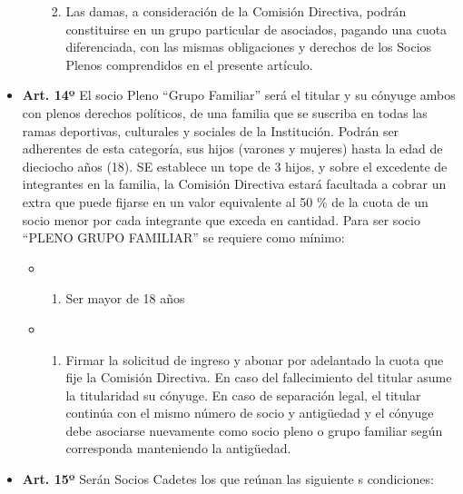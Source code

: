 \documentclass[]{book}
\providecommand{\tightlist}{%
  \setlength{\itemsep}{0pt}\setlength{\parskip}{0pt}}
\begin{document}
\begin{itemize}
\begin{itemize}
\begin{enumerate}
    \def\labelenumi{\alph{enumi})}
    \setcounter{enumi}{4}
    \tightlist
    \item
      Las damas, a consideración de la Comisión Directiva, podrán
      constituirse en un grupo particular de asociados, pagando una
      cuota diferenciada, con las mismas obligaciones y derechos de los
      Socios Plenos comprendidos en el presente artículo.
    \end{enumerate}
  \end{itemize}
\item
  \textbf{Art. 14º} El socio Pleno ``Grupo Familiar'' será el titular y
  su cónyuge ambos con plenos derechos políticos, de una familia que se
  suscriba en todas las ramas deportivas, culturales y sociales de la
  Institución. Podrán ser adherentes de esta categoría, sus hijos
  (varones y mujeres) hasta la edad de dieciocho años (18). SE establece
  un tope de 3 hijos, y sobre el excedente de integrantes en la familia,
  la Comisión Directiva estará facultada a cobrar un extra que puede
  fijarse en un valor equivalente al 50 \% de la cuota de un socio menor
  por cada integrante que exceda en cantidad. Para ser socio ``PLENO
  GRUPO FAMILIAR'' se requiere como mínimo:

  \begin{itemize}
  \item
    \begin{enumerate}
    \def\labelenumi{\alph{enumi})}
    \tightlist
    \item
      Ser mayor de 18 años
    \end{enumerate}
  \item
    \begin{enumerate}
    \def\labelenumi{\alph{enumi})}
    \setcounter{enumi}{1}
    \tightlist
    \item
      Firmar la solicitud de ingreso y abonar por adelantado la cuota
      que fije la Comisión Directiva. En caso del fallecimiento del
      titular asume la titularidad su cónyuge. En caso de separación
      legal, el titular continúa con el mismo número de socio y
      antigüedad y el cónyuge debe asociarse nuevamente como socio pleno
      o grupo familiar según corresponda manteniendo la antigüedad.
    \end{enumerate}
  \end{itemize}
\item
  \textbf{Art. 15º} Serán Socios Cadetes los que reúnan las siguiente s
  condiciones:


\end{itemize}
\end{document}
